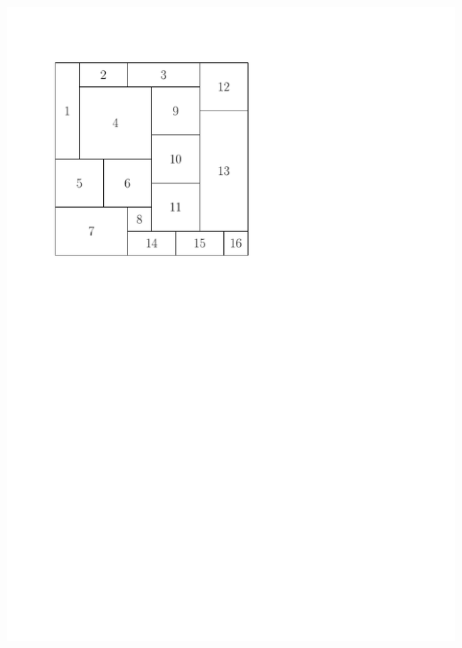\documentclass[11pt]{beamer}%
\begin{document}
\begin{frame}
  
  \begin{center}
  \includegraphics[page=13,height=\textheight]{Example16.pdf}
  \end{center}
\end{frame}
\end{document}
